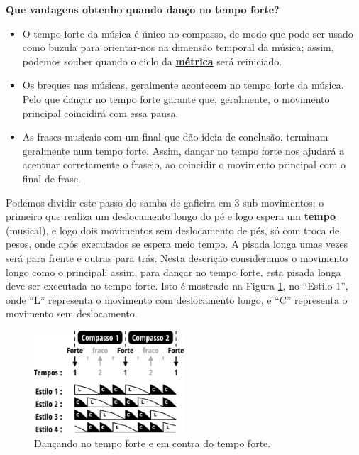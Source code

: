\begin{tcbinformation} 
\label{ref:beneficiosdancarforte}
\textbf{Que vantagens obtenho quando danço no tempo forte?}
\begin{itemize}
\item O tempo forte da música é único no compasso, 
de modo que pode ser usado como buzula para orientar-nos na dimensão temporal da música; assim,
podemos souber quando o ciclo da \hyperref[def:Metrica]{\textbf{métrica}} será reiniciado.
\item Os breques nas músicas, geralmente acontecem no tempo forte da música.
Pelo que dançar no tempo forte garante que, geralmente, 
o movimento principal coincidirá com essa pausa.
\item As frases musicais com um final que dão ideia de conclusão,
terminam geralmente num tempo forte.
Assim, dançar no tempo forte nos ajudará a acentuar corretamente o fraseio,
ao coincidir o movimento principal com o final de frase. 
\end{itemize}
\end{tcbinformation} 

\begin{example}
\label{ex:frentetrasex}
Podemos dividir este passo do samba de gafieira em 3 sub-movimentos; 
o primeiro que realiza um deslocamento longo do pé e logo espera um \hyperref[sec:Tempo]{\textbf{tempo}} (musical),
e logo dois movimentos sem deslocamento de pés, só com troca de pesos,
 onde após executados se espera meio tempo. 
A pisada longa umas vezes será para frente e outras para trás. 
Nesta descrição consideramos o movimento longo como o principal;
assim, para dançar no tempo forte, esta pisada longa deve ser executada no tempo forte.
Isto é mostrado na Figura \ref{fig:tempovscontratempo}, no ``Estilo 1'',
onde ``L'' representa o movimento com deslocamento longo,
e ``C'' representa o movimento sem deslocamento.
\end{example}


\begin{figure}[h]
    \centering 
\includegraphics[width=0.5\textwidth]{chapters/cap-musicalidade/bailarcontratempo.eps}
    \caption{Dançando no tempo forte e em contra do tempo forte.}\label{fig:tempovscontratempo}
\end{figure}




